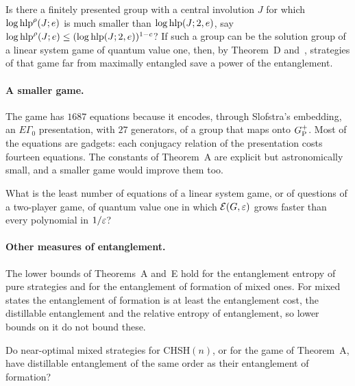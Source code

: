 \begin{question}\label{q:flat}
Is there a finitely presented group with a central involution $J$ for which $\log\operatorname{hlp}^{\rho}(J;e)$ is much smaller than
$\log\operatorname{hlp}(J;2,e)$, say $\log\operatorname{hlp}^{\rho}(J;e)\le(\log\operatorname{hlp}(J;2,e))^{1-c}$? If such a group can be the solution group of a linear system game of
quantum value one, then, by Theorem~D and~\cite[Cor.~4.6]{SV18}, strategies of that game far from maximally entangled save a power of the
entanglement.
\end{question}

\paragraph{A smaller game.} The game has $1687$ equations because it encodes, through Slofstra's embedding, an $E\Gamma_0$ presentation,
with $27$ generators, of a group that maps onto $G_{\mathrm P}^{+}$. Most of the equations are gadgets: each conjugacy relation of the presentation
costs fourteen equations. The constants of Theorem~A are explicit but astronomically small, and a smaller game would improve them too.

\begin{question}\label{q:small}
What is the least number of equations of a linear system game, or of questions of a two-player game, of quantum value one in which
$\mathcal E(G,\varepsilon)$ grows faster than every polynomial in $1/\varepsilon$?
\end{question}

\paragraph{Other measures of entanglement.} The lower bounds of Theorems~A and~E hold for the entanglement entropy of pure strategies and for
the entanglement of formation of mixed ones. For mixed states the entanglement of formation is at least the entanglement cost, the
distillable entanglement and the relative entropy of entanglement, so lower bounds on it do not bound these.

\begin{question}\label{q:distill}
Do near-optimal mixed strategies for CHSH$(n)$, or for the game of Theorem~A, have distillable entanglement of the same order as their
entanglement of formation?
\end{question}
